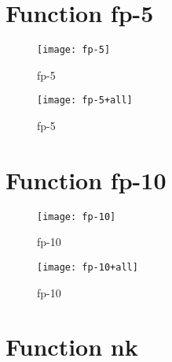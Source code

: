 \section{Function fp-5}

\begin{center}

\end{center}

\begin{center}

\end{center}

\begin{figure}[h]
\begin{center}
\texttt{[image: fp-5]}
\caption{fp-5}
\end{center}
\end{figure}

\begin{figure}[h]
\begin{center}
\texttt{[image: fp-5+all]}
\caption{fp-5}
\end{center}
\end{figure}

\newpage

\section{Function fp-10}

\begin{center}

\end{center}

\begin{center}

\end{center}

\begin{figure}[h]
\begin{center}
\texttt{[image: fp-10]}
\caption{fp-10}
\end{center}
\end{figure}

\begin{figure}[h]
\begin{center}
\texttt{[image: fp-10+all]}
\caption{fp-10}
\end{center}
\end{figure}

\newpage

\section{Function nk}

